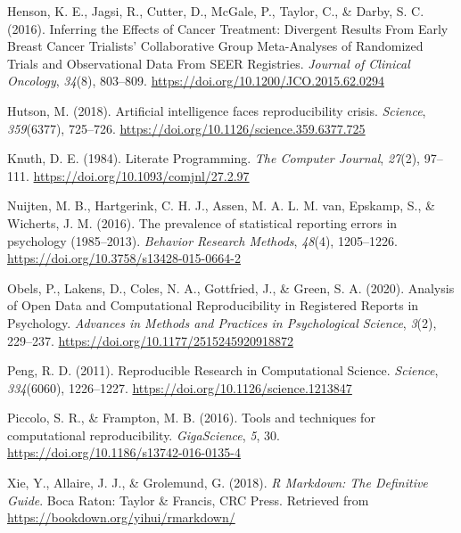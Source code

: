 \documentclass[
  ,man,floatsintext]{apa6}
\newlength{\cslhangindent}
\newlength{\cslentryspacingunit} %
\newenvironment{CSLReferences}[2] %
 {%
  \setlength{\parindent}{0pt}
  \ifodd #1
  \let\oldpar\par
  \def\par{\hangindent=\cslhangindent\oldpar}
  \fi
  \setlength{\parskip}{#2\cslentryspacingunit}
 }%
 {}
\begin{document}
\begin{CSLReferences}{1}{0}
\leavevmode{}%
Henson, K. E., Jagsi, R., Cutter, D., McGale, P., Taylor, C., \& Darby, S. C. (2016). Inferring the Effects of Cancer Treatment: Divergent Results From Early Breast Cancer Trialists' Collaborative Group Meta-Analyses of Randomized Trials and Observational Data From SEER Registries. \emph{Journal of Clinical Oncology}, \emph{34}(8), 803--809. \url{https://doi.org/10.1200/JCO.2015.62.0294}

\leavevmode{}%
Hutson, M. (2018). Artificial intelligence faces reproducibility crisis. \emph{Science}, \emph{359}(6377), 725--726. \url{https://doi.org/10.1126/science.359.6377.725}

\leavevmode{}%
Knuth, D. E. (1984). Literate Programming. \emph{The Computer Journal}, \emph{27}(2), 97--111. \url{https://doi.org/10.1093/comjnl/27.2.97}

\leavevmode{}%
Nuijten, M. B., Hartgerink, C. H. J., Assen, M. A. L. M. van, Epskamp, S., \& Wicherts, J. M. (2016). The prevalence of statistical reporting errors in psychology (1985--2013). \emph{Behavior Research Methods}, \emph{48}(4), 1205--1226. \url{https://doi.org/10.3758/s13428-015-0664-2}

\leavevmode{}%
Obels, P., Lakens, D., Coles, N. A., Gottfried, J., \& Green, S. A. (2020). Analysis of Open Data and Computational Reproducibility in Registered Reports in Psychology. \emph{Advances in Methods and Practices in Psychological Science}, \emph{3}(2), 229--237. \url{https://doi.org/10.1177/2515245920918872}

\leavevmode{}%
Peng, R. D. (2011). Reproducible Research in Computational Science. \emph{Science}, \emph{334}(6060), 1226--1227. \url{https://doi.org/10.1126/science.1213847}

\leavevmode{}%
Piccolo, S. R., \& Frampton, M. B. (2016). Tools and techniques for computational reproducibility. \emph{GigaScience}, \emph{5}, 30. \url{https://doi.org/10.1186/s13742-016-0135-4}

\leavevmode{}%
Xie, Y., Allaire, J. J., \& Grolemund, G. (2018). \emph{R Markdown: The Definitive Guide}. Boca Raton: Taylor \& Francis, CRC Press. Retrieved from \url{https://bookdown.org/yihui/rmarkdown/}

\end{CSLReferences}
\end{document}

